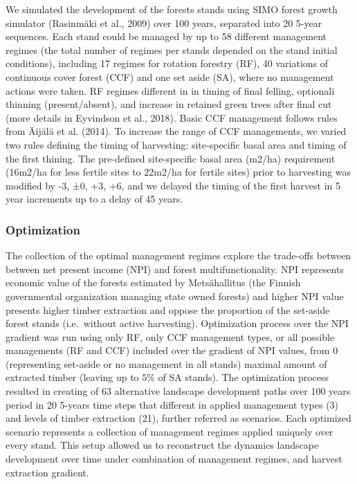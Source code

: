 \documentclass[]{elsarticle} %
\begin{document}
We simulated the development of the forests stands using SIMO forest
growth simulator (Rasinmäki et al., 2009) over 100 years, separated into
20 5-year sequences. Each stand could be managed by up to 58 different
management regimes (the total number of regimes per stands depended on
the stand initial conditions), including 17 regimes for rotation
forestry (RF), 40 variations of continuous cover forest (CCF) and one
set aside (SA), where no management actions were taken. RF regimes
different in in timing of final felling, optionali thinning
(present/absent), and increase in retained green trees after final cut
(more details in Eyvindson et al., 2018). Basic CCF management follows
rules from Äijälä et al. (2014). To increase the range of CCF
managements, we varied two rules defining the timing of harvesting:
site-specific basal area and timing of the first thining. The
pre-defined site-specific basal area (m2/ha) requirement (16m2/ha for
less fertile sites to 22m2/ha for fertile sites) prior to harvesting was
modified by -3, ±0, +3, +6, and we delayed the timing of the first
harvest in 5 year increments up to a delay of 45 years.

\subsubsection{Optimization}\label{optimization}

The collection of the optimal management regimes explore the trade-offs
between between net present income (NPI) and forest multifunctionality.
NPI represents economic value of the forests estimated by Metsähallitus
(the Finnish governmental organization managing state owned forests) and
higher NPI value presents higher timber extraction and oppose the
proportion of the set-aside forest stands (i.e.~without active
harvesting). Optimization process over the NPI gradient was run using
only RF, only CCF management types, or all possible managements (RF and
CCF) included over the gradient of NPI values, from 0 (representing
set-aside or no management in all stands) maximal amount of extracted
timber (leaving up to 5\% of SA stands). The optimization process
resulted in creating of 63 alternative landscape development paths over
100 years period in 20 5-years time steps that different in applied
management types (3) and levels of timber extraction (21), further
referred as scenarios. Each optimized scenario represents a collection
of management regimes applied uniquely over every stand. This setup
allowed us to reconstruct the dynamics landscape development over time
under combination of management regimes, and harvest extraction
gradient.
\end{document}
